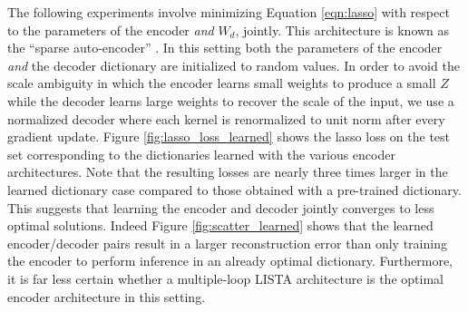 The following experiments involve minimizing Equation \ref{eqn:lasso} with
respect to the parameters of the encoder \emph{and} $W_d$, jointly. This
architecture is known as the ``sparse auto-encoder'' \cite{SAE}. In this
setting both the parameters of the encoder \emph{and} the decoder dictionary
are initialized to random values. In order to avoid the scale ambiguity in
which the encoder learns small weights to produce a small $Z$ while the decoder
learns large weights to recover the scale of the input, we use a normalized
decoder where each kernel is renormalized to unit norm after every gradient
update. Figure \ref{fig:lasso_loss_learned} shows the lasso loss on the test
set corresponding to the dictionaries learned with the various encoder
architectures. Note that the resulting losses are nearly three times larger 
in the learned dictionary case compared to those obtained with a pre-trained dictionary. 
This suggests that learning the encoder and decoder jointly converges to less
optimal solutions. Indeed Figure \ref{fig:scatter_learned} shows that the learned 
encoder/decoder pairs result in a larger reconstruction error than only training 
the encoder to perform inference in an already optimal dictionary. Furthermore, 
it is far less certain whether a multiple-loop LISTA architecture is the optimal 
encoder architecture in this setting.           

